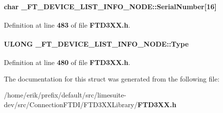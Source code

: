 \paragraph[{Serial\+Number}]{\setlength{\rightskip}{0pt plus 5cm}char \+\_\+\+F\+T\+\_\+\+D\+E\+V\+I\+C\+E\+\_\+\+L\+I\+S\+T\+\_\+\+I\+N\+F\+O\+\_\+\+N\+O\+D\+E\+::\+Serial\+Number[16]}\label{struct__FT__DEVICE__LIST__INFO__NODE_aa8ef6f62dce57202fb99541e11455321}


Definition at line {\bf 483} of file {\bf F\+T\+D3\+X\+X.\+h}.

\paragraph[{Type}]{\setlength{\rightskip}{0pt plus 5cm}U\+L\+O\+NG \+\_\+\+F\+T\+\_\+\+D\+E\+V\+I\+C\+E\+\_\+\+L\+I\+S\+T\+\_\+\+I\+N\+F\+O\+\_\+\+N\+O\+D\+E\+::\+Type}\label{struct__FT__DEVICE__LIST__INFO__NODE_adbec491de6d024dc43b3e6e1005eb183}


Definition at line {\bf 480} of file {\bf F\+T\+D3\+X\+X.\+h}.



The documentation for this struct was generated from the following file\+:\begin{DoxyCompactItemize}
\item 
/home/erik/prefix/default/src/limesuite-\/dev/src/\+Connection\+F\+T\+D\+I/\+F\+T\+D3\+X\+X\+Library/{\bf F\+T\+D3\+X\+X.\+h}\end{DoxyCompactItemize}
